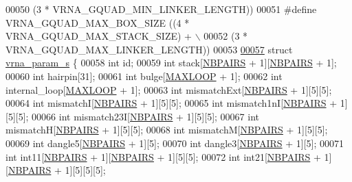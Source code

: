 \begin{DoxyCode}
00050 \textcolor{preprocessor}{                                         (3 * VRNA\_GQUAD\_MIN\_LINKER\_LENGTH))}
00051 \textcolor{preprocessor}{#define   VRNA\_GQUAD\_MAX\_BOX\_SIZE       ((4 * VRNA\_GQUAD\_MAX\_STACK\_SIZE) + \(\backslash\)}
00052 \textcolor{preprocessor}{                                         (3 * VRNA\_GQUAD\_MAX\_LINKER\_LENGTH))}
00053 
\hyperlink{group__energy__parameters}{00057} \textcolor{keyword}{struct }\hyperlink{group__energy__parameters_structvrna__param__s}{vrna\_param\_s} \{
00058   \textcolor{keywordtype}{int}       id;
00059   \textcolor{keywordtype}{int}       stack[\hyperlink{energy__const_8h_a5e75221c779d618eab81e096f37e32ce}{NBPAIRS} + 1][\hyperlink{energy__const_8h_a5e75221c779d618eab81e096f37e32ce}{NBPAIRS} + 1];
00060   \textcolor{keywordtype}{int}       hairpin[31];
00061   \textcolor{keywordtype}{int}       bulge[\hyperlink{energy__const_8h_ad1bd6eabac419670ddd3c9ed82145988}{MAXLOOP} + 1];
00062   \textcolor{keywordtype}{int}       internal\_loop[\hyperlink{energy__const_8h_ad1bd6eabac419670ddd3c9ed82145988}{MAXLOOP} + 1];
00063   \textcolor{keywordtype}{int}       mismatchExt[\hyperlink{energy__const_8h_a5e75221c779d618eab81e096f37e32ce}{NBPAIRS} + 1][5][5];
00064   \textcolor{keywordtype}{int}       mismatchI[\hyperlink{energy__const_8h_a5e75221c779d618eab81e096f37e32ce}{NBPAIRS} + 1][5][5];
00065   \textcolor{keywordtype}{int}       mismatch1nI[\hyperlink{energy__const_8h_a5e75221c779d618eab81e096f37e32ce}{NBPAIRS} + 1][5][5];
00066   \textcolor{keywordtype}{int}       mismatch23I[\hyperlink{energy__const_8h_a5e75221c779d618eab81e096f37e32ce}{NBPAIRS} + 1][5][5];
00067   \textcolor{keywordtype}{int}       mismatchH[\hyperlink{energy__const_8h_a5e75221c779d618eab81e096f37e32ce}{NBPAIRS} + 1][5][5];
00068   \textcolor{keywordtype}{int}       mismatchM[\hyperlink{energy__const_8h_a5e75221c779d618eab81e096f37e32ce}{NBPAIRS} + 1][5][5];
00069   \textcolor{keywordtype}{int}       dangle5[\hyperlink{energy__const_8h_a5e75221c779d618eab81e096f37e32ce}{NBPAIRS} + 1][5];
00070   \textcolor{keywordtype}{int}       dangle3[\hyperlink{energy__const_8h_a5e75221c779d618eab81e096f37e32ce}{NBPAIRS} + 1][5];
00071   \textcolor{keywordtype}{int}       int11[\hyperlink{energy__const_8h_a5e75221c779d618eab81e096f37e32ce}{NBPAIRS} + 1][\hyperlink{energy__const_8h_a5e75221c779d618eab81e096f37e32ce}{NBPAIRS} + 1][5][5];
00072   \textcolor{keywordtype}{int}       int21[\hyperlink{energy__const_8h_a5e75221c779d618eab81e096f37e32ce}{NBPAIRS} + 1][\hyperlink{energy__const_8h_a5e75221c779d618eab81e096f37e32ce}{NBPAIRS} + 1][5][5][5];

\end{DoxyCode}
